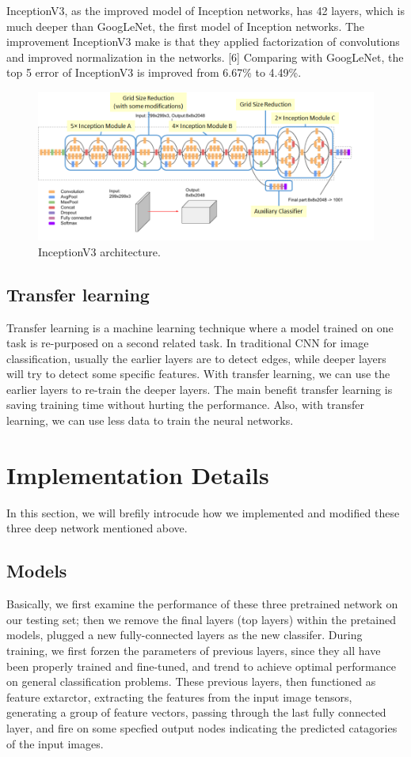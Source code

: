 \documentclass{article}
\begin{document}
InceptionV3, as the improved model of Inception networks, has 42 layers, which is much deeper than GoogLeNet, the first model of Inception networks. The improvement InceptionV3 make is that they applied factorization of convolutions and improved normalization in the networks. [6] Comparing with GoogLeNet, the top 5 error of InceptionV3 is improved from 6.67\% to 4.49\%.

\begin{figure}[H]
	\centering
	\includegraphics[width=0.8\linewidth]{pics/inception} 
	\caption{InceptionV3 architecture.}
\end{figure}

\subsection{Transfer learning}

Transfer learning is a machine learning technique where a model trained on one task is re-purposed on a second related task. 
In traditional CNN for image classification, usually the earlier layers are to detect edges, while deeper layers will try to detect some specific features. 
With transfer learning, we can use the earlier layers to re-train the deeper layers. The main benefit transfer learning is saving training time without hurting the performance. Also, with transfer learning, we can use less data to train the neural networks. 

\section{Implementation Details}

In this section, we will brefily introcude how we implemented and modified these three deep network mentioned above. 
\subsection{Models}
Basically, we first examine the performance of these three pretrained network on our testing set; then we remove the final layers (top layers) within the pretained models, plugged a new fully-connected layers as the new classifer. 
During training, we first forzen the parameters of previous layers, since they all have been properly trained and fine-tuned, and trend to achieve optimal performance on general classification problems. 
These previous layers, then functioned as feature extarctor, extracting the features from the input image tensors, generating a group of feature vectors, passing through the last fully connected layer, and fire on some specfied output nodes indicating the predicted catagories of the input images. 
\end{document}
